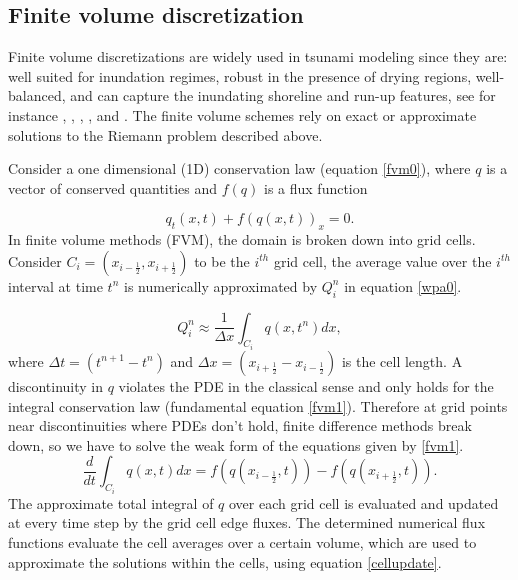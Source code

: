 \documentclass[9pt,a4paper]{article}
\begin{document}
	\subsection{Finite volume discretization}
	Finite volume discretizations are widely used in tsunami modeling since they are: well suited for inundation regimes, robust in the presence of drying regions, well-balanced, and can capture the inundating shoreline and run-up features, see for instance   \citet{ge:2008,ge:2011,george2006finite}, \citet{be-ge-le-ma:2011}, \citet{bi2014finite}, \citet{leveque2002finite}, and \citet{ba-le-mi-ro:2003}. The finite volume schemes rely on exact or approximate solutions to the Riemann problem described above.  
	
	Consider a one dimensional (1D) conservation law  (equation \eqref{fvm0}),  where $q$ is a vector of conserved quantities and $f(q)$ is a flux function
	
	\begin{equation}
		q_{t}(x,t) + f(q(x,t))_{x} = 0.
		\label{fvm0}
	\end{equation}	
	In finite volume methods (FVM), the domain is broken down into grid cells. Consider $C_{i} = (x_{i-\frac{1}{2}},x_{i+\frac{1}{2}})$ to be the $i^{th}$ grid cell, the average value over the $i^{th}$ interval at time $t^{n}$ is numerically approximated by $Q_{i}^{n}$ in equation \eqref{wpa0}.
	
	\begin{equation}
		Q_{i}^{n} \approx \dfrac{1}{\Delta x} \int_{C_{i}}q(x,t^{n})dx,
		\label{wpa0}
	\end{equation}
	where $\Delta t = (t^{n+1} - t^{n})$ and  $\Delta x = (x_{i+\frac{1}{2}} - x_{i-\frac{1}{2}})$ is the cell length. A discontinuity in $q$ violates the PDE in the classical sense and only holds for the integral conservation law (fundamental equation \eqref{fvm1}). Therefore at grid points near discontinuities where PDEs don't hold, finite difference methods break down, so we have to solve the weak form of
	the equations given by  \eqref{fvm1}. 	
	\begin{equation}
		\frac{d}{dt} \int_{C_{i}} q(x,t)dx = f(q(x_{i-\frac{1}{2}},t)) -  f(q(x_{i+\frac{1}{2}},t)).
		\label{fvm1}
	\end{equation}	
	The approximate  total integral of $q$ over each grid cell is evaluated and updated at every time step by the grid cell edge fluxes. The determined numerical flux functions evaluate the  cell averages over a certain volume, which are used to approximate the solutions within the cells, using equation \eqref{cellupdate}.
	
\end{document}
